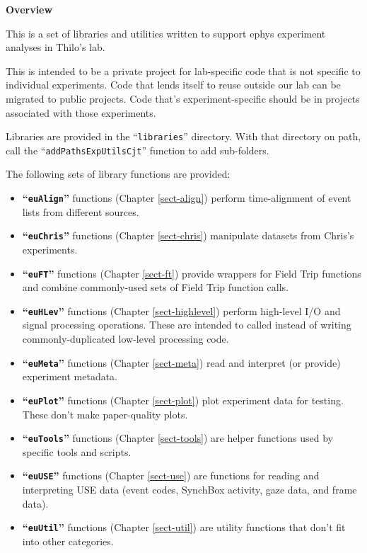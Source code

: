 
\iffalse
%
\chapter{Overview}
%
\else
%
\vspace*{0.75in}
{\Huge \bfseries Overview}
\vspace*{\baselineskip}
\label{sect-over}
%
\fi

This is a set of libraries and utilities written to support ephys experiment
analyses in Thilo's lab.

This is intended to be a private project for lab-specific code that is not
specific to individual experiments. Code that lends itself to reuse outside
our lab can be migrated to public projects. Code that's experiment-specific
should be in projects associated with those experiments.

Libraries are provided in the ``\texttt{libraries}'' directory. With that
directory on path, call the \linebreak ``\texttt{addPathsExpUtilsCjt}''
function to add sub-folders.

The following sets of library functions are provided:
\begin{itemize}
%
\item \textbf{``\texttt{euAlign}''} functions (Chapter \ref{sect-align})
perform time-alignment of event lists from different sources.
%
\item \textbf{``\texttt{euChris}''} functions (Chapter \ref{sect-chris})
manipulate datasets from Chris's experiments.
%
\item \textbf{``\texttt{euFT}''} functions (Chapter \ref{sect-ft})
provide wrappers for Field Trip functions and combine commonly-used sets
of Field Trip function calls.
%
\item \textbf{``\texttt{euHLev}''} functions (Chapter \ref{sect-highlevel})
perform high-level I/O and signal processing operations. These are intended
to called instead of writing commonly-duplicated low-level processing code.
%
\item \textbf{``\texttt{euMeta}''} functions (Chapter \ref{sect-meta})
read and interpret (or provide) experiment metadata.
%
\item \textbf{``\texttt{euPlot}''} functions (Chapter \ref{sect-plot})
plot experiment data for testing. These don't make paper-quality plots.
%
\item \textbf{``\texttt{euTools}''} functions (Chapter \ref{sect-tools})
are helper functions used by specific tools and scripts.
%
\item \textbf{``\texttt{euUSE}''} functions (Chapter \ref{sect-use})
are functions for reading and interpreting USE data (event codes, SynchBox
activity, gaze data, and frame data).
%
\item \textbf{``\texttt{euUtil}''} functions (Chapter \ref{sect-util})
are utility functions that don't fit into other categories.
%
\end{itemize}

